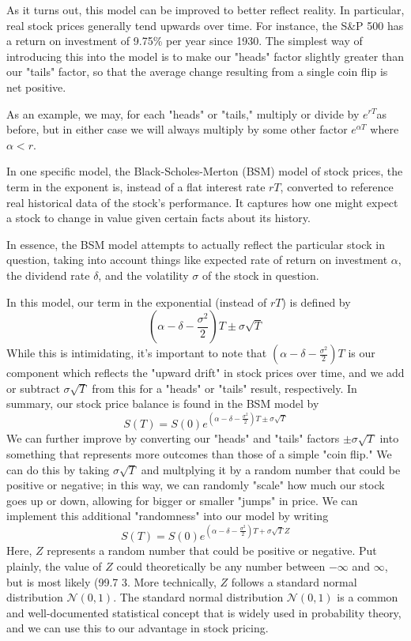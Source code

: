 \documentclass[letterpaper,12pt]{article}
\begin{document}
As it turns out, this model can be improved to better reflect reality. In 
particular, real stock prices generally tend upwards over time. For instance, 
the S\&P 500 has a return on investment of 9.75\% per year since 1930. The simplest 
way of introducing this into the model is to make our "heads" factor slightly 
greater than our "tails" factor, so that the average change resulting from a 
single coin flip is net positive. 

As an example, we may, for each "heads" or "tails," multiply or divide by 
$e^{rT}$as before, but in either case we will always multiply by some other 
factor $e^{\alpha T}$ where $\alpha < r$.

In one specific model, the Black-Scholes-Merton (BSM) model of stock prices, 
the term in the exponent is, instead of a flat interest rate $rT$, converted 
to reference real historical data of the stock's performance. It captures how 
one might expect a stock to change in value given certain facts about its history.

In essence, the BSM model attempts to actually reflect the particular stock 
in question, taking into account things like expected rate of return on investment 
$\alpha$, the dividend rate $\delta$, and the volatility $\sigma$ of the stock 
in question. 

In this model, our term in the exponential (instead of $rT$) is defined by
$$\left(\alpha - \delta - \frac{\sigma ^2}{2} \right)T \pm \sigma\sqrt{T}$$
While this is intimidating, it's important to note that $\left(\alpha - \delta 
- \frac{\sigma ^2}{2} \right)T$ is our component which reflects the "upward 
drift" in stock prices over time, and we add or subtract $\sigma\sqrt{T}$ from 
this for a "heads" or "tails" result, respectively. In summary, our stock price 
balance is found in the BSM model by
$$S(T) = S(0) e^{\left(\alpha - \delta - \frac{\sigma ^2}{2} \right)T \pm \sigma\sqrt{T}}$$
We can further improve by converting our "heads" and "tails" factors $\pm\sigma\sqrt{T}$ 
into something that represents more outcomes than those of a simple "coin flip." 
We can do this by taking $\sigma\sqrt{T}$ and multplying it by a random number 
that could be positive or negative; in this way, we can randomly "scale" how 
much our stock goes up or down, allowing for bigger or smaller "jumps" in price. 
We can implement this additional "randomness" into our model by writing
$$S(T) = S(0) e^{\left(\alpha - \delta - \frac{\sigma ^2}{2} \right)T + \sigma\sqrt{T}Z}$$
Here, $Z$ represents a random number that could be positive or negative. Put 
plainly, the value of $Z$ could theoretically be any number between $-\infty$ 
and $\infty$, but is most likely (99.7%
3. More technically, $Z$ follows a standard normal distribution $\mathcal{N}(0,1)$. 
The standard normal distribution $\mathcal{N}(0,1)$ is a common and well-documented 
statistical concept that is widely used in probability theory, and we can use 
this to our advantage in stock pricing.
\end{document}
